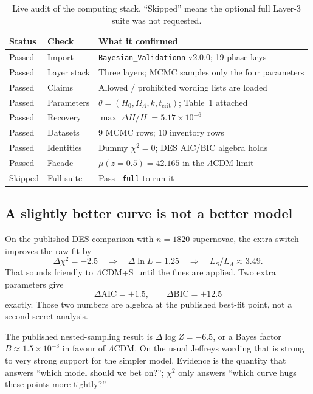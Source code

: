 \documentclass[12pt,letterpaper]{article}
\newcommand{\Lcdms}{$\Lambda$CDM+S}
\newcommand{\tcrit}{t_{\mathrm{crit}}}
\begin{document}
\begin{table}[H]
\centering
\caption{Live audit of the computing stack. ``Skipped'' means the
optional full Layer-3 suite was not requested.}
\label{tab:audit}
\begin{tabular}{llp{}}
\toprule
Status & Check & What it confirmed \\
\midrule
Passed & Import        & \texttt{Bayesian\_Validationn} v2.0.0; 19 phase keys \\
Passed & Layer stack   & Three layers; MCMC samples only the four parameters \\
Passed & Claims        & Allowed / prohibited wording lists are loaded \\
Passed & Parameters    & $\theta=(H_0,\Omega_\Lambda,k,\tcrit)$; Table~1 attached \\
Passed & Recovery      & $\max|\Delta H/H|=5.17\times 10^{-6}$ \\
Passed & Datasets      & 9 MCMC rows; 10 inventory rows \\
Passed & Identities    & Dummy $\chi^2=0$; DES AIC/BIC algebra holds \\
Passed & Facade        & $\mu(z=0.5)=42.165$ in the $\Lambda$CDM limit \\
Skipped & Full suite   & Pass \texttt{--full} to run it \\
\bottomrule
\end{tabular}
\end{table}

\subsection{A slightly better curve is not a better model}

On the published DES comparison with $n=1820$ supernovae, the extra
switch improves the raw fit by
\begin{equation}
  \Delta\chi^2=-2.5
  \quad\Rightarrow\quad
  \Delta\ln L=1.25
  \quad\Rightarrow\quad
  L_S/L_\Lambda \approx 3.49.
\end{equation}
That sounds friendly to \Lcdms\ until the fines are applied. Two extra
parameters give
\[
  \Delta\mathrm{AIC}=+1.5,\qquad \Delta\mathrm{BIC}=+12.5
\]
exactly. Those two numbers are algebra at the published best-fit
point, not a second secret analysis.

The published nested-sampling result is $\Delta\log Z=-6.5$, or a Bayes
factor $B\approx 1.5\times 10^{-3}$ in favour of $\Lambda$CDM. On the
usual Jeffreys wording that is strong to very strong support for the
simpler model. Evidence is the quantity that answers ``which model
should we bet on?''; $\chi^2$ only answers ``which curve hugs these
points more tightly?''
\end{document}
